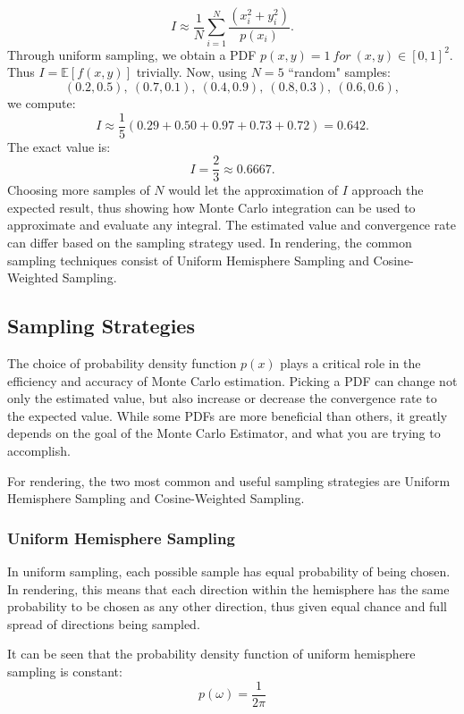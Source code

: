 \documentclass[12pt]{article}
\begin{document}
\[
I \approx \frac{1}{N} \sum_{i=1}^{N} \frac{(x_i^2 + y_i^2)}{p(x_i)}.
\]
Through uniform sampling, we obtain a PDF $p(x,y) = 1\ for\ (x,y) \in [0,1]^2$.
Thus $I = \mathbb{E}[f(x,y)]$ trivially.
\newline
Now, using $N = 5$ ``random" samples:
\[
(0.2,0.5),\ (0.7,0.1),\ (0.4,0.9),\ (0.8,0.3),\ (0.6,0.6),
\]
we compute:
\[
I \approx \frac{1}{5}(0.29 + 0.50 + 0.97 + 0.73 + 0.72) = 0.642.
\]
The exact value is:
\[
I = \frac{2}{3} \approx 0.6667.
\]
Choosing more samples of $N$ would let the approximation of $I$ approach the expected result, thus showing how Monte Carlo integration can be used to approximate and evaluate any integral. The estimated value and convergence rate can differ based on the sampling strategy used. In rendering, the common sampling techniques consist of Uniform Hemisphere Sampling and Cosine-Weighted Sampling.

\subsection{Sampling Strategies}
The choice of probability density function $p(x)$ plays a critical role in the efficiency and accuracy of Monte Carlo estimation. Picking a PDF can change not only the estimated value, but also increase or decrease the convergence rate to the expected value. While some PDFs are more beneficial than others, it greatly depends on the goal of the Monte Carlo Estimator, and what you are trying to accomplish.

For rendering, the two most common and useful sampling strategies are Uniform Hemisphere Sampling and Cosine-Weighted Sampling.

\subsubsection{Uniform Hemisphere Sampling}

In uniform sampling, each possible sample has equal probability of being chosen. 
In rendering, this means that each direction within the hemisphere has the same probability to  be chosen as any other direction, thus given equal chance and full spread of directions being sampled. 

It can be seen that the probability density function of uniform hemisphere sampling is constant: 
\[
p(\omega) = \frac{1}{2\pi}
\]
\end{document}
